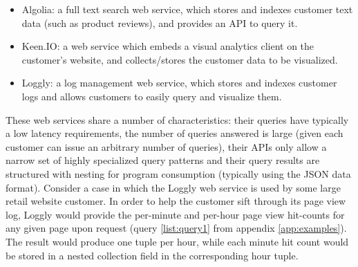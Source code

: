 \begin{itemize}
\item Algolia: a full text search web service, which stores and indexes customer text data (such as product reviews), and provides an API to query it.
\item Keen.IO: a web service which embeds a visual analytics client on the customer's website, and collects/stores the customer data to be visualized.
\item Loggly: a log management web service, which stores and indexes customer logs and allows customers to easily query and visualize them.
\end{itemize}

These web services share a number of characteristics: their queries have typically a low latency requirements, the number of queries answered is large (given each customer can issue an arbitrary number of queries), their APIs only allow a narrow set of highly specialized query patterns and their query results are structured with nesting for program consumption (typically using the JSON data format). Consider a case in which the Loggly web service is used by some large retail website customer. In order to help the customer sift through its page view log, Loggly would provide the per-minute and per-hour page view hit-counts for any given page upon request (query \ref{list:query1} from appendix \ref{app:examples}). The result would produce one tuple per hour, while each minute hit count would be stored in a nested collection field in the corresponding hour tuple. 

